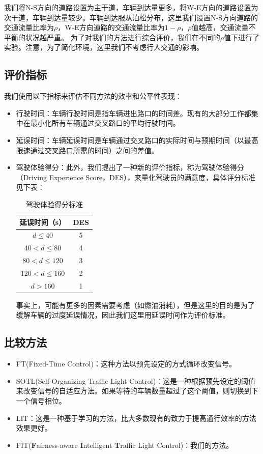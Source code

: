 我们将N-S方向的道路设置为主干道，车辆到达量更多，将W-E方向的道路设置为次干道，车辆到达量较少。车辆到达服从泊松分布，这里我们设置N-S方向道路的交通流量比率为$\rho$，W-E方向道路的交通流量比率为$1-\rho$，$\rho$值越高，交通流量不平衡的状况越严重。
为了对我们的方法进行综合评价，我们在不同的$\rho$值下进行了实验。注意，为了简化环境，这里我们不考虑行人交通的影响。

\subsection{评价指标}
我们使用以下指标来评估不同方法的效率和公平性表现：
\begin{itemize}
    \item 行驶时间：车辆行驶时间是指车辆进出路口的时间差。现有的大部分工作都集中在最小化所有车辆通过交叉路口的平均行驶时间。
    \item 延误时间：车辆延误时间是车辆通过交叉路口的实际时间与预期时间（以最高限速通过交叉路口所需的时间）之间的差值。
    \item 驾驶体验得分：此外，我们提出了一种新的评价指标，称为驾驶体验得分（Driving Experience Score，DES），来量化驾驶员的满意度，具体评分标准见下表：
        \begin{table}[htb]
            \caption{驾驶体验得分标准}
            \begin{tabular}{cc}
            \toprule
            延误时间（s） & DES \\
            \midrule
            $d \leq 40$ & 5\\
            $40 < d \leq 80$ & 4 \\
            $80 < d \leq 120$ & 3 \\
            $120 < d \leq 160$ & 2 \\
            $d > 160$ & 1 \\ 
            \bottomrule
            \end{tabular}
        \end{table}
        事实上，可能有更多的因素需要考虑（如燃油消耗），但是这里的目的是为了缓解车辆的过度延误情况，因此我们这里用延误时间作为评价标准。
\end{itemize}
\subsection{比较方法}
\begin{itemize}
    \item FT(Fixed-Time Control\cite{miller1963settings})：这种方法以预先设定的方式循环改变信号。
    \item SOTL(Self-Organizing Traffic Light Control\cite{cools2013self})：这是一种根据预先设定的阈值来改变信号的自适应方法。如果等待的车辆数量超过了这个阈值，则切换到下一个信号相位。
    \item LIT\cite{zheng2019diagnosing}：这是一种基于学习的方法，比大多数现有的致力于提高通行效率的方法效果更好。
    \item FIT(\textbf{F}airness-aware \textbf{I}ntelligent \textbf{T}raffic Light Control)：我们的方法。
\end{itemize}
